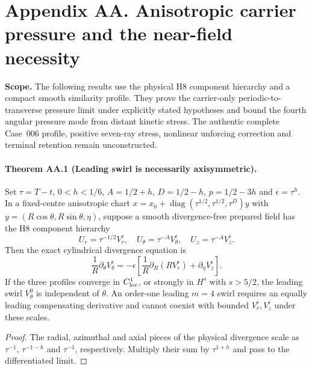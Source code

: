 \clearpage
\section*{Appendix AA. Anisotropic carrier pressure and the near-field necessity}
\noindent\textbf{Scope.} The following results use the physical H8 component hierarchy and a compact smooth similarity profile. They prove the carrier-only periodic-to-transverse pressure limit under explicitly stated hypotheses and bound the fourth angular pressure mode from distant kinetic stress. The authentic complete Case~006 profile, positive seven-ray stress, nonlinear unforcing correction and terminal retention remain unconstructed.

\paragraph{Theorem AA.1 (Leading swirl is necessarily axisymmetric).}
Set $\tau=T-t$, $0<h<1/6$, $A=1/2+h$, $D=1/2-h$, $p=1/2-3h$ and $\epsilon=\tau^h$. In a fixed-centre anisotropic chart
$x=x_0+\operatorname{diag}(\tau^{1/2},\tau^{1/2},\tau^D)y$ with $y=(R\cos\theta,R\sin\theta,\eta)$, suppose a smooth divergence-free prepared field has the H8 component hierarchy
\[
 U_r=\tau^{-1/2}V_r^\epsilon,\quad
 U_\theta=\tau^{-A}V_\theta^\epsilon,\quad
 U_z=\tau^{-A}V_z^\epsilon .
\]
Then the exact cylindrical divergence equation is
\begin{equation}\label{eq:AA-main-div}
\boxed{\frac1R\partial_\theta V_\theta^\epsilon
=-\epsilon\left[\frac1R\partial_R(RV_r^\epsilon)
+\partial_\eta V_z^\epsilon\right].}
\end{equation}
If the three profiles converge in $C^1_{\rm loc}$, or strongly in $H^s$ with $s>5/2$, the leading swirl $V_\theta^0$ is independent of $\theta$. An order-one leading $m=4$ swirl requires an equally leading compensating derivative and cannot coexist with bounded $V_r^\epsilon,V_z^\epsilon$ under these scales.
\begin{proof}
The radial, azimuthal and axial pieces of the physical divergence scale as $\tau^{-1}$, $\tau^{-1-h}$ and $\tau^{-1}$, respectively. Multiply their sum by $\tau^{1+h}$ and pass to the differentiated limit. \end{proof}

